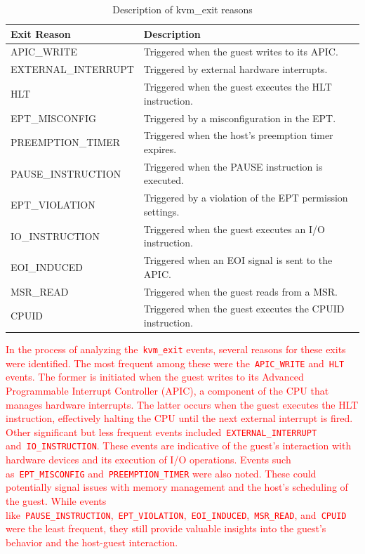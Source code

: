 \documentclass[MMR,Master,english]{twbook}
\begin{document}
\begin{table}[H]
	\centering
	\begin{tabular}{|l|p{}|}
		\hline
		\textbf{Exit Reason} & \textbf{Description}                                     \\ \hline
		APIC\_WRITE          & Triggered when the guest writes to its APIC.             \\ \hline
		EXTERNAL\_INTERRUPT  & Triggered by external hardware interrupts.               \\ \hline
		HLT                  & Triggered when the guest executes the HLT instruction.   \\ \hline
		EPT\_MISCONFIG       & Triggered by a misconfiguration in the EPT.              \\ \hline
		PREEMPTION\_TIMER    & Triggered when the host's preemption timer expires.      \\ \hline
		PAUSE\_INSTRUCTION   & Triggered when the PAUSE instruction is executed.        \\ \hline
		EPT\_VIOLATION       & Triggered by a violation of the EPT permission settings. \\ \hline
		IO\_INSTRUCTION      & Triggered when the guest executes an I/O instruction.    \\ \hline
		EOI\_INDUCED         & Triggered when an EOI signal is sent to the APIC.        \\ \hline
		MSR\_READ            & Triggered when the guest reads from a MSR.               \\ \hline
		CPUID                & Triggered when the guest executes the CPUID instruction. \\ \hline
	\end{tabular}
	\caption{Description of kvm\_exit reasons}
	\label{tab:kvm_exit}
\end{table}

\textcolor{red}{\noindent In the process of analyzing the~\texttt{kvm\_exit} events, several reasons for these exits were identified. The most frequent among these were the~\texttt{APIC\_WRITE} and~\texttt{HLT} events. The former is initiated when the guest writes to its Advanced Programmable Interrupt Controller (APIC), a component of the CPU that manages hardware interrupts. The latter occurs when the guest executes the HLT instruction, effectively halting the CPU until the next external interrupt is fired. Other significant but less frequent events included~\texttt{EXTERNAL\_INTERRUPT} and~\texttt{IO\_INSTRUCTION}. These events are indicative of the guest's interaction with hardware devices and its execution of I/O operations. Events such as~\texttt{EPT\_MISCONFIG} and~\texttt{PREEMPTION\_TIMER} were also noted. These could potentially signal issues with memory management and the host's scheduling of the guest. While events like~\texttt{PAUSE\_INSTRUCTION},~\texttt{EPT\_VIOLATION},~\texttt{EOI\_INDUCED},~\texttt{MSR\_READ}, and~\texttt{CPUID} were the least frequent, they still provide valuable insights into the guest's behavior and the host-guest interaction.}
\end{document}

